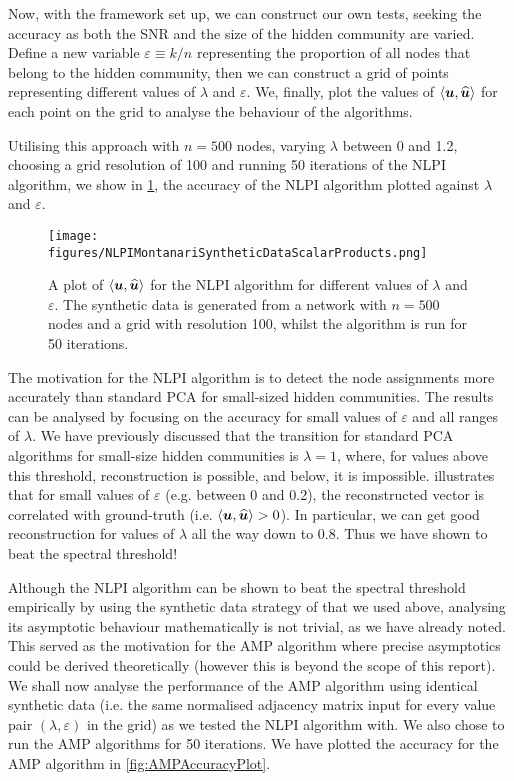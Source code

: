 Now, with the framework set up, we can construct our own tests, seeking the accuracy as both the SNR and the size of the hidden community are varied.
Define a new variable $\varepsilon \equiv k/n$ representing the proportion of all nodes that belong to the hidden community, then we can construct a grid of points representing different values of $\lambda$ and $\varepsilon$.
We, finally, plot the values of $\innerP{\vecvar{u},\widehat{\vecvar{u}}}$ for each point on the grid to analyse the behaviour of the algorithms.

Utilising this approach with $n=500$ nodes, varying $\lambda$ between 0 and 1.2, choosing a grid resolution of 100 and running 50 iterations of the NLPI algorithm, we show in \cref{fig:NLPIAccuracyPlot}, the accuracy of the NLPI algorithm plotted against $\lambda$ and $\varepsilon$.

\begin{figure}
	\centering
	\texttt{[image: figures/NLPIMontanariSyntheticDataScalarProducts.png]}
	\caption[Plot of accuracy for NLPI algorithm.]{\label{fig:NLPIAccuracyPlot} A plot of $\innerP{\vecvar{u},\widehat{\vecvar{u}}}$ for the NLPI algorithm for different values of $\lambda$ and $\varepsilon$. The synthetic data is generated from a network with $n=500$ nodes and a grid with resolution 100, whilst the algorithm is run for 50 iterations.}
\end{figure}

The motivation for the NLPI algorithm is to detect the node assignments more accurately than standard PCA for small-sized hidden communities. The results can be analysed by focusing on the accuracy for small values of $\varepsilon$ and all ranges of $\lambda$.
We have previously discussed that the transition for standard PCA algorithms for small-size hidden communities is $\lambda = 1$, where, for values above this threshold, reconstruction is possible, and below, it is impossible.
 illustrates that for small values of $\varepsilon$ (e.g. between 0 and 0.2), the reconstructed vector is correlated with ground-truth (i.e. $\innerP{\vecvar{u},\widehat{\vecvar{u}}} > 0$).
In particular, we can get good reconstruction for values of $\lambda$ all the way down to 0.8. Thus we have shown to beat the spectral threshold!

Although the NLPI algorithm can be shown to beat the spectral threshold empirically by using the synthetic data strategy of \cite{Mon13}  that we used above, analysing its asymptotic behaviour mathematically is not trivial, as we have already noted.
This served as the motivation for the AMP algorithm where precise asymptotics could be derived theoretically (however this is beyond the scope of this report).
We shall now analyse the performance of the AMP algorithm using identical synthetic data (i.e. the same normalised adjacency matrix input for every value pair $(\lambda,\varepsilon)$ in the grid) as we tested the NLPI algorithm with. We also chose to run the AMP algorithms for 50 iterations.
We have plotted the accuracy for the AMP algorithm in \cref{fig:AMPAccuracyPlot}.

